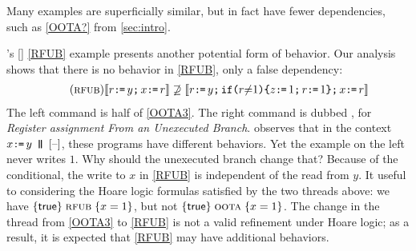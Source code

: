 
Many examples are superficially similar, but in fact have fewer dependencies,
such as \eqref{OOTA?} from \textsection\ref{sec:intro}.

\citeauthor{BoehmOOTA}'s [\citeyear{BoehmOOTA}] \ref{RFUB} example presents
another potential form of \oota{} behavior.
Our analysis shows that there is no \oota{} behavior in
\ref{RFUB}, only a false dependency:
\begin{gather*}
  \tag{\textsc{rfub}}\label{RFUB}
  \sem{r\GETS y\SEMI x\GETS r}
  \not\supseteq
  \sem{r\GETS y\SEMI \IF{r \NOTEQ 1} \THEN z\GETS 1\SEMI r\GETS 1\FI \SEMI x\GETS r}
\end{gather*}
The left command is half of \ref{OOTA3}. %
The right command is dubbed \rfub{}, for \emph{Register assignment From an
  Unexecuted Branch}.  \citeauthor{BoehmOOTA} observes that in the context
$x\GETS y \PAR \hole{}$, these programs have different behaviors.  Yet the
\oota{} example on the left never writes $1$.  Why should the unexecuted
branch change that?  Because of the conditional, the write to $x$ in
\ref{RFUB} is independent of the read from $y$.  It useful to considering the
Hoare logic formulas satisfied by the two threads above: we have
$\{\mathsf{true}\}\allowbreak\;\text{{\sc rfub}}\;\allowbreak\{x=1\}$, but not
$\{\mathsf{true}\}\allowbreak\;\text{{\sc oota}}\;\allowbreak\{x=1\}$.  The change in the thread from
\ref{OOTA3} to \ref{RFUB} is not a valid refinement under Hoare logic; as a
result, it is expected that \ref{RFUB} may have additional behaviors.

